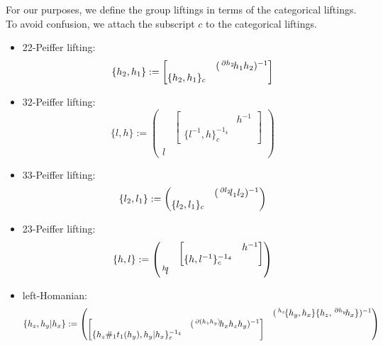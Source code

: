 \documentclass[11pt, reqno]{amsart} %
\newcommand{\act}[1]{\,\sp{#1}\!}
\theoremstyle{definition}
\theoremstyle{remark}
\numberwithin{equation}{section}
\begin{document}
For our purposes, we define the group liftings in terms of the categorical liftings. To avoid confusion, we attach the subscript $c$ to the categorical liftings.
\begin{center}
\begin{minipage}{.495\columnwidth}
\begin{itemize}
  \item 22-Peiffer lifting:
  \[
    \{h_2,h_1\} := \begin{bmatrix}& (\act{\partial h_2}h_1h_2)^{-1} \\ \{h_2,h_1\}_c & \end{bmatrix}
  \]
  \item 32-Peiffer lifting:
  \[
    \{l,h\} := \begin{pmatrix} & \begin{bmatrix} & h^{-1} \\ \{l^{-1},h\}_c^{-1_4} & \end{bmatrix}\\ l &\end{pmatrix}
  \]
\end{itemize}
\end{minipage}
\begin{minipage}{.495\columnwidth}
\begin{itemize}
  \item 33-Peiffer lifting:
  \[
    \{l_2,l_1\} := \begin{pmatrix} & (\act{\partial l_2}l_1l_2)^{-1} \\ \{l_2,l_1\}_c & \end{pmatrix}
  \]
  \item 23-Peiffer lifting:
  \[
    \{h,l\} := \begin{pmatrix} & \begin{bmatrix} & h^{-1} \\ \{h,l^{-1}\}_c^{-1_4} & \end{bmatrix}\\\act{h}l &\end{pmatrix}
  \]
\end{itemize}
\end{minipage}
\begin{itemize}
  \item left-Homanian:
  \[
    \{h_z,h_y|h_x\} := \begin{pmatrix} & (\act{h_z}\{h_y,h_x\}\{h_z,\act{\partial h_y}h_x\})^{-1} \\ \begin{bmatrix} & (\act{\partial(h_zh_y)}h_xh_zh_y)^{-1} \\ \{h_z\#_1t_1(h_y),h_y|h_x\}_c^{-1_4} & \end{bmatrix} & \end{pmatrix}
\]
\end{itemize}
\end{center}
\end{document}

